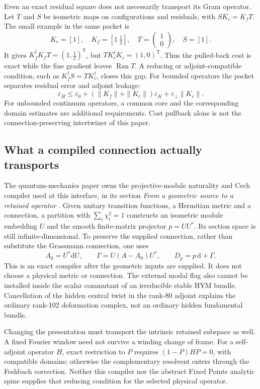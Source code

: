 \documentclass[11pt]{article}
\theoremstyle{definition}
\theoremstyle{remark}
\newcommand{\dd}{\mathrm d}
\newcommand{\Ran}{\operatorname{Ran}}
\begin{document}
Even an exact residual square does not necessarily transport its Gram
operator.  Let \(T\) and \(S\) be isometric maps on configurations and
residuals, with \(SK_c=K_fT\).  The small example in the same packet is
\[
K_c=[1],\quad K_f=[1\ \tfrac12],\quad
T=\begin{pmatrix}1\\0\end{pmatrix},\quad S=[1].
\]
It gives \(K_f^\dagger K_fT=(1,\tfrac12)^\mathsf{T}\), but
\(TK_c^\dagger K_c=(1,0)^\mathsf{T}\).  Thus the pulled-back cost is exact
while the fine gradient leaves \(\Ran T\).  A reducing or adjoint-compatible
condition, such as \(K_f^\dagger S=TK_c^\dagger\), closes this gap.  For
bounded operators the packet separates residual error and adjoint leakage:
\[
\varepsilon_H\le\varepsilon_0+
(\|K_f\|+\|K_c\|)\varepsilon_K+
\varepsilon_\perp\|K_c\|.
\]
For unbounded continuum operators, a common core and the corresponding
domain estimates are additional requirements.  Cost pullback alone is not
the connection-preserving intertwiner of this paper.

\subsection{What a compiled connection actually transports}
\label{sec:consumer-compiler}

The quantum-mechanics paper owns the projective-module naturality and
Cech compiler used at this interface, in its section \emph{From a geometric
source to a retained operator} \cite{NeroQM2026,ConsumerNaturality,ConsumerCech}.
Given unitary transition functions, a Hermitian metric and a connection,
a partition with \(\sum_i\chi_i^2=1\) constructs an isometric module
embedding \(U\) and the smooth finite-matrix projector \(p=UU^*\).
Its section space is still infinite-dimensional. To preserve the supplied
connection, rather than substitute the Grassmann connection, one uses
\[
 A_0=U^*\dd U,\qquad
 \Gamma=U(A-A_0)U^*,\qquad D_p=p\,\dd+\Gamma .
\]
This is an exact compiler after the geometric inputs are supplied. It
does not choose a physical metric or connection. The external modal flag
also cannot be installed inside the scalar commutant of an irreducible
stable HYM bundle. Cancellation of the hidden central twist in the
rank-80 adjoint explains the ordinary rank-102 deformation complex, not
an ordinary hidden fundamental bundle.

Changing the presentation must transport the intrinsic retained subspace
as well. A fixed Fourier window need not survive a winding change of
frame. For a self-adjoint operator \(H\), exact restriction to \(P\)
requires \((1-P)HP=0\), with compatible domains; otherwise the complementary
resolvent enters through the Feshbach correction. Neither this compiler
nor the abstract Fixed Points analytic spine supplies that reducing
condition for the selected physical operator.
\end{document}
